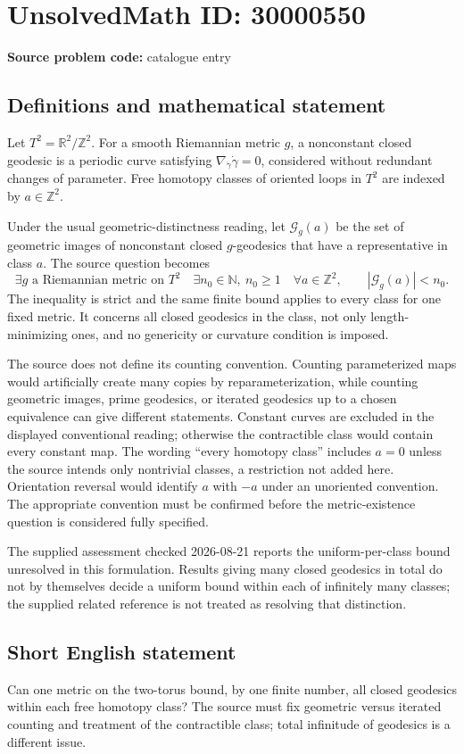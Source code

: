 \documentclass[11pt]{article}
\newcommand{\N}{\mathbb{N}}
\newcommand{\Z}{\mathbb{Z}}
\newcommand{\R}{\mathbb{R}}
\begin{document}
\section*{UnsolvedMath ID: 30000550}
\textbf{Source problem code:} catalogue entry
\subsection{Definitions and mathematical statement}
Let \(T^2=\R^2/\Z^2\). For a smooth Riemannian metric \(g\), a nonconstant closed geodesic is a periodic curve satisfying \(\nabla_{\dot\gamma}\dot\gamma=0\), considered without redundant changes of parameter. Free homotopy classes of oriented loops in \(T^2\) are indexed by \(a\in\Z^2\).

Under the usual geometric-distinctness reading, let \(\mathcal G_g(a)\) be the set of geometric images of nonconstant closed \(g\)-geodesics that have a representative in class \(a\). The source question becomes
\[
\exists g\text{ a Riemannian metric on }T^2\quad
\exists n_0\in\N,\ n_0\geq1\quad
\forall a\in\Z^2,\qquad |\mathcal G_g(a)|<n_0.
\]
The inequality is strict and the same finite bound applies to every class for one fixed metric. It concerns all closed geodesics in the class, not only length-minimizing ones, and no genericity or curvature condition is imposed.

The source does not define its counting convention. Counting parameterized maps would artificially create many copies by reparameterization, while counting geometric images, prime geodesics, or iterated geodesics up to a chosen equivalence can give different statements. Constant curves are excluded in the displayed conventional reading; otherwise the contractible class would contain every constant map. The wording ``every homotopy class'' includes \(a=0\) unless the source intends only nontrivial classes, a restriction not added here. Orientation reversal would identify \(a\) with \(-a\) under an unoriented convention. The appropriate convention must be confirmed before the metric-existence question is considered fully specified.

The supplied assessment checked 2026-08-21 reports the uniform-per-class bound unresolved in this formulation. Results giving many closed geodesics in total do not by themselves decide a uniform bound within each of infinitely many classes; the supplied related reference is not treated as resolving that distinction.
\subsection{Short English statement}
Can one metric on the two-torus bound, by one finite number, all closed geodesics within each free homotopy class? The source must fix geometric versus iterated counting and treatment of the contractible class; total infinitude of geodesics is a different issue.
\end{document}

